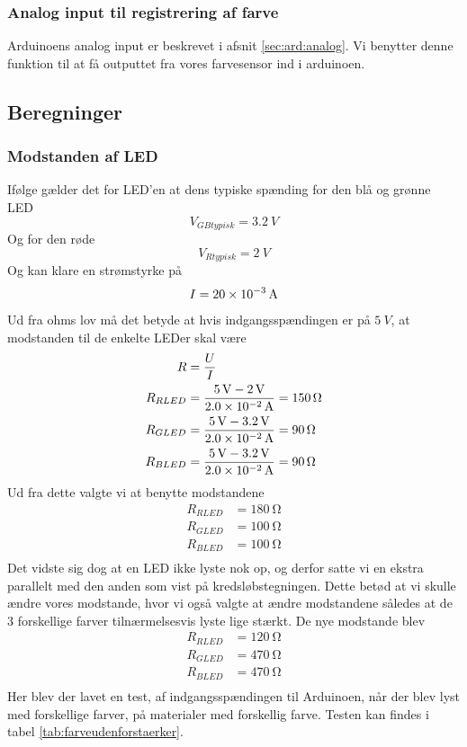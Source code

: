 \subsubsection{Analog input til registrering af farve}
Arduinoens analog input er beskrevet i afsnit \ref{sec:ard:analog}. Vi benytter denne funktion til at få outputtet fra vores farvesensor ind i arduinoen.
\subsection{Beregninger}
\subsubsection{Modstanden af LED}
Ifølge \cite{kompLED} gælder det for LED'en at dens typiske spænding for den blå og grønne LED
\[
	V_{GB typisk} = \SI{3.2}{V}
\]
Og for den røde 
\[
	V_{R typisk} = \SI{2}{V}
\]
Og kan klare en strømstyrke på
\[
	I = \SI{20d-3}{A} 
\]
Ud fra ohms lov må det betyde at hvis indgangsspændingen er på $\SI{5}{V}$, at modstanden til de enkelte LEDer skal være
\begin{align}
	R&= \frac{U}{I}\\
	R_{RLED} &= \frac{\SI{5}{V}-\SI{2}{V}}{\SI{2.0d-2}{A}} = \SI{150}{\ohm}\\
	R_{GLED} &= \frac{\SI{5}{V}-\SI{3.2}{V}}{\SI{2.0d-2}{A}} = \SI{90}{\ohm}\\
	R_{BLED} &= \frac{\SI{5}{V}-\SI{3.2}{V}}{\SI{2.0d-2}{A}} = \SI{90}{\ohm}\\
\end{align}
Ud fra dette valgte vi at benytte modstandene 
\begin{align}
	R_{RLED} &= \SI{180}{\ohm}\\
	R_{GLED} &= \SI{100}{\ohm}\\
	R_{BLED} &= \SI{100}{\ohm}\\
\end{align}
Det vidste sig dog at en LED ikke lyste nok op, og derfor satte vi en ekstra parallelt med den anden som vist på kredsløbstegningen. Dette betød at vi skulle ændre vores modstande, hvor vi også valgte at ændre modstandene således at de 3 forskellige farver tilnærmelsesvis lyste lige stærkt. De nye modstande blev 
\begin{align}
	R_{RLED} &= \SI{120}{\ohm}\\
	R_{GLED} &= \SI{470}{\ohm}\\
	R_{BLED} &= \SI{470}{\ohm}\\
\end{align}
Her blev der lavet en test, af indgangsspændingen til Arduinoen, når der blev lyst med forskellige farver, på materialer med forskellig farve. Testen kan findes i tabel \ref{tab:farveudenforstaerker}.

